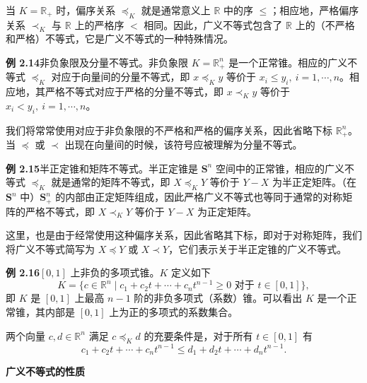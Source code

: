 \documentclass[UTF8, 12pt, fontset=fandol, oneside]{ctexart}
\begin{document}
当 $K=\mathbb{R}_+$ 时，偏序关系 $\preceq_K$ 就是通常意义上 $\mathbb{R}$ 中的序 $\le$；相应地，严格偏序关系 $\prec_K$ 与 $\mathbb{R}$ 上的严格序 $<$ 相同。因此，广义不等式包含了 $\mathbb{R}$ 上的（不严格和严格）不等式，它是广义不等式的一种特殊情况。

\noindent\textbf{例 2.14}\quad 非负象限及分量不等式。非负象限 $K=\mathbb{R}_+^n$ 是一个正常锥。相应的广义不等式 $\preceq_K$ 对应于向量间的分量不等式，即 $x\preceq_K y$ 等价于 $x_i\le y_i,\ i=1,\cdots,n$。相应地，其严格不等式对应于严格的分量不等式，即 $x\prec_K y$ 等价于 $x_i<y_i,\ i=1,\cdots,n$。

我们将常常使用对应于非负象限的不严格和严格的偏序关系，因此省略下标 $\mathbb{R}_+^n$。当 $\preceq$ 或 $\prec$ 出现在向量间的时候，该符号应被理解为分量不等式。

\noindent\textbf{例 2.15}\quad 半正定锥和矩阵不等式。半正定锥是 $\mathbf{S}^n$ 空间中的正常锥，相应的广义不等式 $\preceq_K$ 就是通常的矩阵不等式，即 $X\preceq_KY$ 等价于 $Y-X$ 为半正定矩阵。（在 $\mathbf{S}^n$ 中）$\mathbf{S}_+^n$ 的内部由正定矩阵组成，因此严格广义不等式也等同于通常的对称矩阵的严格不等式，即 $X\prec_KY$ 等价于 $Y-X$ 为正定矩阵。

这里，也是由于经常使用这种偏序关系，因此省略其下标，即对于对称矩阵，我们将广义不等式简写为 $X\preceq Y$ 或 $X\prec Y$，它们表示关于半正定锥的广义不等式。

\noindent\textbf{例 2.16}\quad $[0,1]$ 上非负的多项式锥。$K$ 定义如下
\begin{equation}
  K=\{c\in\mathbb{R}^n\mid c_1+c_2t+\cdots+c_nt^{n-1}\ge 0\text{ 对于 }t\in[0,1]\},
  \tag{2.15}
\end{equation}
即 $K$ 是 $[0,1]$ 上最高 $n-1$ 阶的非负多项式（系数）锥。可以看出 $K$ 是一个正常锥，其内部是 $[0,1]$ 上为正的多项式的系数集合。

两个向量 $c,d\in\mathbb{R}^n$ 满足 $c\preceq_K d$ 的充要条件是，对于所有 $t\in[0,1]$ 有
\[
  c_1+c_2t+\cdots+c_nt^{n-1}
  \le d_1+d_2t+\cdots+d_nt^{n-1}.
\]

\noindent\textbf{广义不等式的性质}
\end{document}
